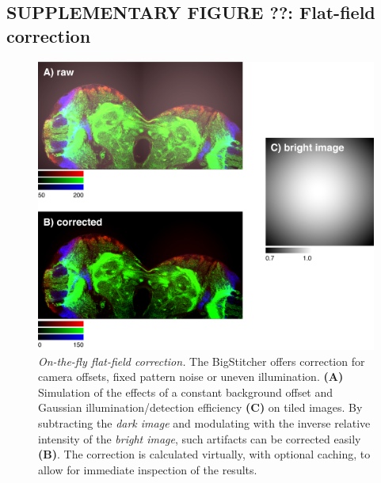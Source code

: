 \documentclass[]{spie}  %
\begin{document}
\subsection*{SUPPLEMENTARY FIGURE ??: Flat-field correction}
\vspace{1mm}
\begin{figure}[h!]
\includegraphics[width=\textwidth]{fig-flatfield.png}
\vspace{-2.0mm}
\caption{\hspace{-0.5mm} \emph{On-the-fly flat-field correction.} The BigStitcher offers correction for camera offsets, fixed pattern noise or uneven illumination. \textbf{(A)}  Simulation of the effects of a constant background offset and Gaussian illumination/detection efficiency \textbf{(C)} on tiled images. By subtracting the \emph{dark image} and modulating with the inverse relative intensity of the \emph{bright image}, such artifacts can be corrected easily \textbf{(B)}. The correction is calculated virtually, with optional caching, to allow for immediate inspection of the results.
}
\label{fig:sup-fig-flatfield}
\end{figure}

\pagebreak
\end{document}
